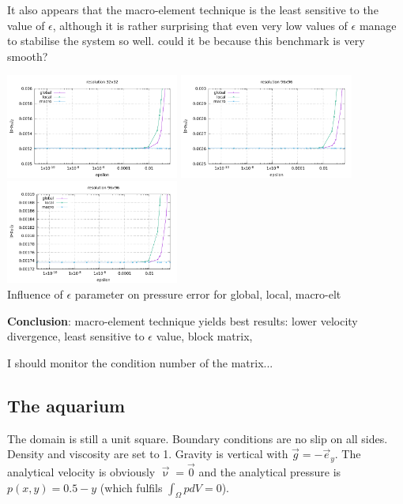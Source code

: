 It also appears that the macro-element technique is the least sensitive to the value of $\epsilon$, 
although it is rather surprising that even very low values of $\epsilon$ manage to stabilise the 
system so well. could it be because this benchmark is very smooth? 
\begin{center}
\includegraphics[width=5.7cm]{python_codes/fieldstone_115/results/dh/errorsP_32_eps}
\includegraphics[width=5.7cm]{python_codes/fieldstone_115/results/dh/errorsP_64_eps}
\includegraphics[width=5.7cm]{python_codes/fieldstone_115/results/dh/errorsP_96_eps}\\
{\captionfont Influence of $\epsilon$ parameter on pressure error for global, local, macro-elt}
\end{center}

{\bf Conclusion}: macro-element technique yields best results: lower velocity divergence, 
least sensitive to $\epsilon$ value, block matrix,

I should monitor the condition number of the matrix...

\newpage
\subsection*{The aquarium}

The domain is still a unit square. Boundary conditions are no slip on all sides. 
Density and viscosity are set to 1. Gravity is vertical with $\vec{g}=-\vec{e}_y$.
The analytical velocity is obviously $\vec\upnu=\vec{0}$ and the analytical pressure
is $p(x,y)=0.5-y$ (which fulfils $\int_\Omega p dV=0$).

